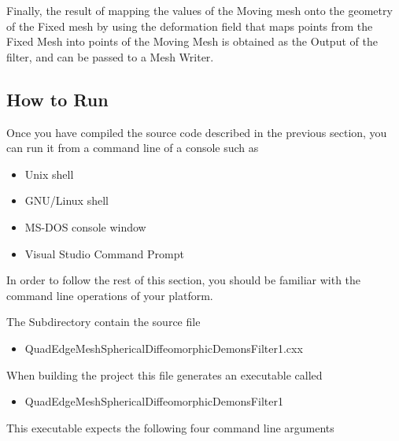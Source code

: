 \documentclass{InsightArticle}
\begin{document}
\begin{center}

\end{center}

Finally, the result of mapping the values of the Moving mesh onto the geometry
of the Fixed mesh by using the deformation field that maps points from the
Fixed Mesh into points of the Moving Mesh is obtained as the Output of the filter,
and can be passed to a Mesh Writer.

\begin{center}

\end{center}


\subsection{How to Run}

Once you have compiled the source code described in the previous section, you
can run it from a command line of a console such as

\begin{itemize}
\item Unix shell
\item GNU/Linux shell
\item MS-DOS console window
\item Visual Studio Command Prompt
\end{itemize}

In order to follow the rest of this section, you should be familiar with the
command line operations of your platform.

The Subdirectory  contain the source file 

\begin{itemize}
\item QuadEdgeMeshSphericalDiffeomorphicDemonsFilter1.cxx
\end{itemize}

When building the project this file generates an executable called

\begin{itemize}
\item QuadEdgeMeshSphericalDiffeomorphicDemonsFilter1
\end{itemize}

This executable expects the following four command line arguments
\end{document}
